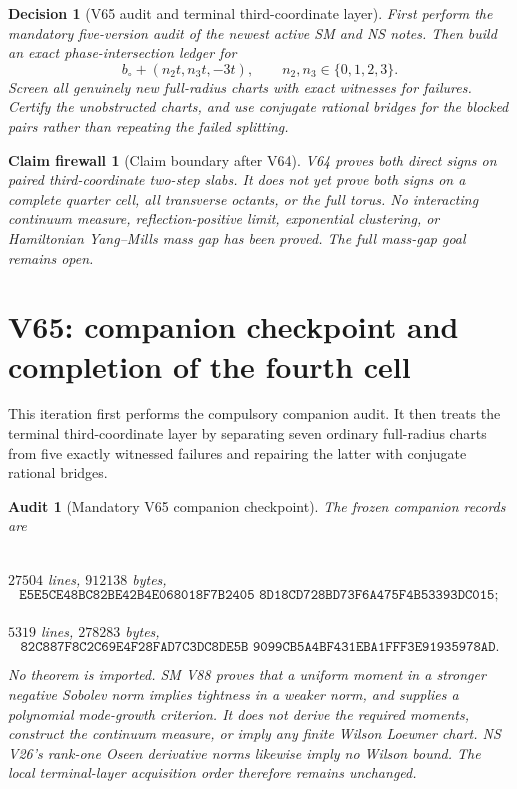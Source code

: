 \documentclass[11pt,oneside]{article}
\newtheorem{firewall}[theorem]{Claim firewall}
\newtheorem{audit}[theorem]{Audit}
\newtheorem{decision}[theorem]{Decision}
\theoremstyle{definition}
\theoremstyle{remark}
\begin{document}
\begin{decision}[V65 audit and terminal third-coordinate layer]
\label{dec:newv64-next}
First perform the mandatory five-version audit of the newest active
SM and NS notes.  Then build an exact phase-intersection ledger for
\[
 b_\circ+(n_2t,n_3t,-3t),\qquad n_2,n_3\in\{0,1,2,3\}. \tag{64.13}
\]
Screen all genuinely new full-radius charts with exact witnesses
for failures.  Certify the unobstructed charts, and use conjugate
rational bridges for the blocked pairs rather than repeating the
failed splitting.
\end{decision}

\begin{firewall}[Claim boundary after V64]
\label{fire:newv64-final}
V64 proves both direct signs on paired third-coordinate two-step
slabs.  It does not yet prove both signs on a complete quarter cell,
all transverse octants, or the full torus.  No interacting
continuum measure, reflection-positive limit, exponential
clustering, or Hamiltonian Yang--Mills mass gap has been proved.
The full mass-gap goal remains open.
\end{firewall}

\section{V65: companion checkpoint and completion of the fourth cell}
\label{sec:newv65-fourth-cell}

This iteration first performs the compulsory companion audit.  It
then treats the terminal third-coordinate layer by separating seven
ordinary full-radius charts from five exactly witnessed failures and
repairing the latter with conjugate rational bridges.

\begin{audit}[Mandatory V65 companion checkpoint]
\label{audit:newv65-companions}
The frozen companion records are
\begin{center}
\small
{}\\
\(27504\) lines, \(912138\) bytes,
\[
\texttt{E5E5CE48BC82BE42B4E068018F7B2405
8D18CD728BD73F6A475F4B53393DC015};
\]
\\
\(5319\) lines, \(278283\) bytes,
\[
\texttt{82C887F8C2C69E4F28FAD7C3DC8DE5B
9099CB5A4BF431EBA1FFF3E91935978AD}.                  \tag{65.1}
\]
\end{center}
No theorem is imported.  SM V88 proves that a uniform moment in a
stronger negative Sobolev norm implies tightness in a weaker norm,
and supplies a polynomial mode-growth criterion.  It does not
derive the required moments, construct the continuum measure, or
imply any finite Wilson Loewner chart.  NS V26's rank-one Oseen
derivative norms likewise imply no Wilson bound.  The local
terminal-layer acquisition order therefore remains unchanged.
\end{audit}
\end{document}
